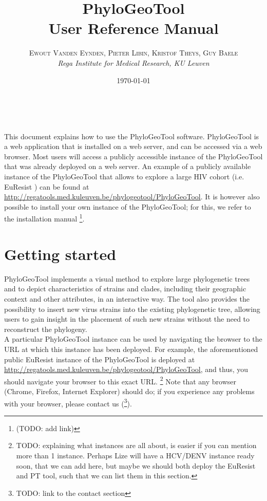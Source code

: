 \documentclass[a4paper, 11pt]{article} %
\title{\textbf{PhyloGeoTool}\\ %
User Reference Manual} %
\author{\textsc{Ewout Vanden Eynden, Pieter Libin, Kristof Theys, Guy Baele} %
\\{\textit{Rega Institute for Medical Research, KU Leuven}}} %
\date{\today} %
\makeatletter
\renewcommand{\maketitle}{ %
\begin{flushright} %
{\LARGE\@title} %

\vspace{50pt} %

{\large\@author} %
\\\@date %

\vspace{40pt} %
\end{flushright}
}
\makeatother
\begin{document}
\maketitle %

\vspace{30pt} %

\tableofcontents
\newpage

This document explains how to use the PhyloGeoTool software. PhyloGeoTool is a web application that is installed on a web server, and can be accessed via a web browser. 
Most users will access a publicly accessible instance of the PhyloGeoTool that was already deployed on a web server. 
An example of a publicly available instance of the PhyloGeoTool that allows to explore a large HIV cohort (i.e. EuResist \cite{Zazzi2012}) can be found at \url{http://regatools.med.kuleuven.be/phylogeotool/PhyloGeoTool}.
It is however also possible to install your own instance of the PhyloGeoTool; for this, we refer to the installation manual \footnote{(TODO: add link)}.


\section{Getting started}

PhyloGeoTool implements a visual method to explore large phylogenetic trees and to depict characteristics of strains and clades, including their geographic context and other attributes, in an interactive way.
The tool also provides the possibility to insert new virus strains into the existing phylogenetic tree, allowing users to gain insight in the placement of such new strains without the need to reconstruct the phylogeny. \\

A particular PhyloGeoTool instance can be used by navigating the browser to the URL at which this instance has been deployed. For example, the aforementioned public EuResist instance of the PhyloGeoTool is deployed at \url{http://regatools.med.kuleuven.be/phylogeotool/PhyloGeoTool}, and thus, you should navigate your browser to this exact URL.
\footnote{TODO: explaining what instances are all about, is easier if you can mention more than 1 instance. 
Perhaps Lize will have a HCV/DENV instance ready soon, that we can add here, but maybe we should both deploy the EuResist and PT tool, such that we can list them in this section.}
Note that any browser (Chrome, Firefox, Internet Explorer) should do; if you experience any problems with your browser, please contact us (\footnote{TODO: link to the contact section}).
\end{document}
